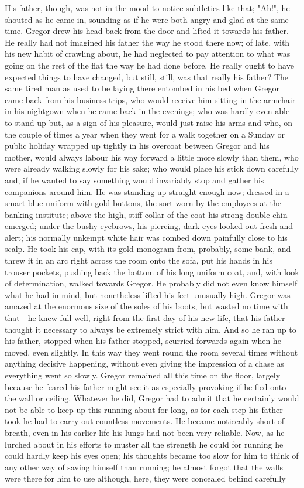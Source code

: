 \documentclass[12pt]{book}
\begin{document}
    His father, though, was not in the mood to notice subtleties like that; "Ah!", he shouted as he came in, sounding as if he were both angry and glad at the same time. Gregor drew his head back from the door and lifted it towards his father. He really had not imagined his father the way he stood there now; of late, with his new habit of crawling about, he had neglected to pay attention to what was going on the rest of the flat the way he had done before. He really ought to have expected things to have changed, but still, still, was that really his father? The same tired man as used to be laying there entombed in his bed when Gregor came back from his business trips, who would receive him sitting in the armchair in his nightgown when he came back in the evenings; who was hardly even able to stand up but, as a sign of his pleasure, would just raise his arms and who, on the couple of times a year when they went for a walk together on a Sunday or public holiday wrapped up tightly in his overcoat between Gregor and his mother, would always labour his way forward a little more slowly than them, who were already walking slowly for his sake; who would place his stick down carefully and, if he wanted to say something would invariably stop and gather his companions around him. He was standing up straight enough now; dressed in a smart blue uniform with gold buttons, the sort worn by the employees at the banking institute; above the high, stiff collar of the coat his strong double-chin emerged; under the bushy eyebrows, his piercing, dark eyes looked out fresh and alert; his normally unkempt white hair was combed down painfully close to his scalp. He took his cap, with its gold monogram from, probably, some bank, and threw it in an arc right across the room onto the sofa, put his hands in his trouser pockets, pushing back the bottom of his long uniform coat, and, with look of determination, walked towards Gregor. He probably did not even know himself what he had in mind, but nonetheless lifted his feet unusually high. Gregor was amazed at the enormous size of the soles of his boots, but wasted no time with that - he knew full well, right from the first day of his new life, that his father thought it necessary to always be extremely strict with him. And so he ran up to his father, stopped when his father stopped, scurried forwards again when he moved, even slightly. In this way they went round the room several times without anything decisive happening, without even giving the impression of a chase as everything went so slowly. Gregor remained all this time on the floor, largely because he feared his father might see it as especially provoking if he fled onto the wall or ceiling. Whatever he did, Gregor had to admit that he certainly would not be able to keep up this running about for long, as for each step his father took he had to carry out countless movements. He became noticeably short of breath, even in his earlier life his lungs had not been very reliable. Now, as he lurched about in his efforts to muster all the strength he could for running he could hardly keep his eyes open; his thoughts became too slow for him to think of any other way of saving himself than running; he almost forgot that the walls were there for him to use although, here, they were concealed behind carefully 
\end{document}
